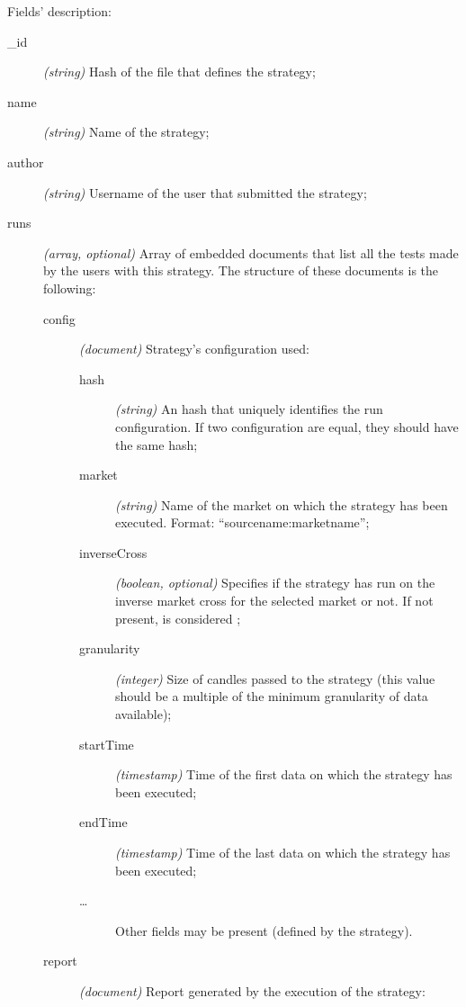 Fields' description:
\begin{description}
	\item[\_id] \textit{(string)} Hash of the file that defines the
		strategy;
	\item[name] \textit{(string)} Name of the strategy;
	\item[author] \textit{(string)} Username of the user that submitted the
		strategy;
	\item[runs] \textit{(array, optional)} Array of embedded documents that
		list all the tests made by the users with this strategy. The
		structure of these documents is the following:
		\begin{description}
			\item[config] \textit{(document)} Strategy's
				configuration used:
				\begin{description}
					\item[hash] \textit{(string)} An hash
						that uniquely identifies the
						run configuration. If two
						configuration are equal, they
						should have the same hash;
					\item[market] \textit{(string)} Name of
						the market on which the strategy
						has been executed. Format:
						\enquote{sourcename:marketname};
					\item[inverseCross] \textit{(boolean,
						optional)} Specifies if the
						strategy has run on the inverse
						market cross for the selected
						market or not. If not present,
						is considered ;
					\item[granularity] \textit{(integer)}
						Size of candles passed to the
						strategy (this value should be a
						multiple of the minimum
						granularity of data available);
					\item[startTime]
						\textit{(timestamp)} Time of the
						first data on which the strategy
						has been executed;
					\item[endTime]
						\textit{(timestamp)} Time of the
						last data on which the strategy
						has been executed;
					\item[\ldots] Other fields may be
						present (defined by the
						strategy).
				\end{description}
			\item[report] \textit{(document)} Report generated by
				the execution of the strategy:
				\begin{description}
					\item[netProfit] \textit{(numeric)} The
						profit (\(\interval[open

\end{description}
\end{description}
\end{description}
